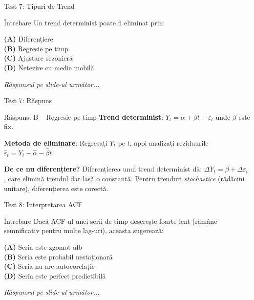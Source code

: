 \documentclass[9pt, aspectratio=169, t]{beamer}
\begin{document}
\begin{frame}{Test 7: Tipuri de Trend}
    \begin{alertblock}{Întrebare}
        Un trend determinist poate fi eliminat prin:
    \end{alertblock}

    \vspace{0.4cm}

    \textcolor{MainBlue}{\textbf{(A)}} Diferențiere\\[3pt]
    \textcolor{MainBlue}{\textbf{(B)}} Regresie pe timp\\[3pt]
    \textcolor{MainBlue}{\textbf{(C)}} Ajustare sezonieră\\[3pt]
    \textcolor{MainBlue}{\textbf{(D)}} Netezire cu medie mobilă

    \vspace{0.5cm}

    \begin{center}
        \textit{Răspunsul pe slide-ul următor...}
    \end{center}
\end{frame}

\begin{frame}{Test 7: Răspuns}
    \begin{exampleblock}{Răspuns: B -- Regresie pe timp}
        \textbf{Trend determinist}: $Y_t = \alpha + \beta t + \varepsilon_t$ unde $\beta$ este fix.

        \textbf{Metoda de eliminare}: Regresați $Y_t$ pe $t$, apoi analizați reziduurile $\hat{\varepsilon}_t = Y_t - \hat{\alpha} - \hat{\beta}t$

        \textbf{De ce nu diferențiere?} Diferențierea unui trend determinist dă: $\Delta Y_t = \beta + \Delta\varepsilon_t$, care elimină trendul dar lasă o constantă. Pentru trenduri \textit{stochastice} (rădăcini unitare), diferențierea este corectă.
    \end{exampleblock}
\end{frame}

\begin{frame}{Test 8: Interpretarea ACF}
    \begin{alertblock}{Întrebare}
        Dacă ACF-ul unei serii de timp descrește foarte lent (rămâne semnificativ pentru multe lag-uri), aceasta sugerează:
    \end{alertblock}

    \vspace{0.4cm}

    \textcolor{MainBlue}{\textbf{(A)}} Seria este zgomot alb\\[3pt]
    \textcolor{MainBlue}{\textbf{(B)}} Seria este probabil nestaționară\\[3pt]
    \textcolor{MainBlue}{\textbf{(C)}} Seria nu are autocorelație\\[3pt]
    \textcolor{MainBlue}{\textbf{(D)}} Seria este perfect predictibilă

    \vspace{0.5cm}

    \begin{center}
        \textit{Răspunsul pe slide-ul următor...}
    \end{center}
\end{frame}
\end{document}
